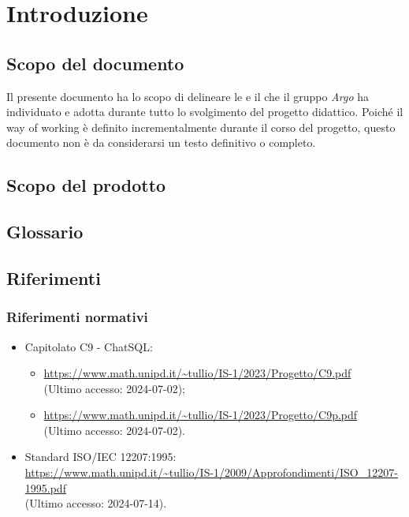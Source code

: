 \section{Introduzione}

\subsection{Scopo del documento}
Il presente documento ha lo scopo di delineare le  e il  che il gruppo \textit{Argo} ha individuato e adotta durante tutto lo svolgimento del progetto didattico. Poiché il way of working è definito incrementalmente durante il corso del progetto, questo documento non è da considerarsi un testo definitivo o completo.

\subsection{Scopo del prodotto}
\ScopoDelProdotto


\subsection{Glossario}
\GlossarioIntroduzione


\subsection{Riferimenti}

\subsubsection{Riferimenti normativi}
\begin{itemize}
  \item Capitolato C9 - ChatSQL:
  \begin{itemize}
    \item \href{https://www.math.unipd.it/~tullio/IS-1/2023/Progetto/C9.pdf}{https://www.math.unipd.it/\textasciitilde tullio/IS-1/2023/Progetto/C9.pdf} \\ (Ultimo accesso: 2024-07-02);
    \item \href{https://www.math.unipd.it/~tullio/IS-1/2023/Progetto/C9.pdf}{https://www.math.unipd.it/\textasciitilde tullio/IS-1/2023/Progetto/C9p.pdf} \\ (Ultimo accesso: 2024-07-02).
  \end{itemize}
  \item Standard ISO/IEC 12207:1995:\\ \url{https://www.math.unipd.it/~tullio/IS-1/2009/Approfondimenti/ISO_12207-1995.pdf} \\ (Ultimo accesso: 2024-07-14).
\end{itemize}

